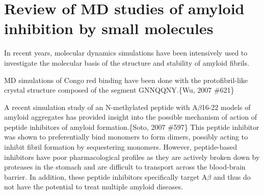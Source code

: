 \section{Review of MD studies of amyloid inhibition by small molecules}

\begin{outline}
	\1 In recent years, molecular dynamics simulations have been intensively used to investigate the molecular basis of the structure and stability of amyloid fibrils. 
	
	\1 MD simulations of Congo red binding have been done with the protofibril-like crystal structure composed of the segment GNNQQNY.\{Wu, 2007 \#621\}
	
	\1 A recent simulation study of an N-methylated peptide with A$\beta$16-22 models of amyloid aggregates has provided insight into the possible mechanism of action of peptide inhibitors of amyloid formation.\{Soto, 2007 \#597\} This peptide inhibitor was shown to preferentially bind monomers to form dimers, possibly acting to inhibit fibril formation by sequestering monomers. However, peptide-based inhibitors have poor pharmacological profiles as they are actively broken down by proteases in the stomach and are difficult to transport across the blood-brain barrier. In addition, these peptide inhibitors specifically target A$\beta$ and thus do not have the potential to treat multiple amyloid diseases.
\end{outline}











